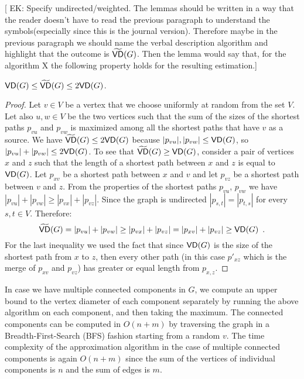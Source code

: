 [ EK: Specify undirected/weighted. The lemmas should be written in a way that the reader doesn't have to 
read the previous paragraph to understand the symbols(especially since this is the journal version). 
Therefore maybe in the previous paragraph we should name the verbal description algorithm and highlight that the outcome is  $\widetilde{\mathsf{VD}}(G)$.
Then the lemma would say that, for the algorithm X the following property holds
for the resulting estimation.]
\begin{lemma}\label{lem:diam}
  $\mathsf{VD}(G)\le\widetilde{\mathsf{VD}}(G)\le 2\mathsf{VD}(G)$.
\end{lemma}
\begin{proof}
  Let $v\in V$ be a vertex that we choose uniformly at random from the set $V$.
  Let also $u,w\in V$ be the two vertices such that the sum of the sizes of the
  shortest paths $p_{vu}$ and $p_{vw}$ is maximized among all the shortest paths
  that have $v$ as a source.  We have $\widetilde{\mathsf{VD}}(G)\le 2\mathsf{VD}(G)$ because
  $|p_{vu}|,|p_{vw}|\le\mathsf{VD}(G)$, so $|p_{vu}|+|p_{vw}|\le 2\mathsf{VD}(G)$. To see
  that $\widetilde{\mathsf{VD}}(G)\ge\mathsf{VD}(G)$, consider a pair of vertices $x$ and $z$ such
  that the length of a shortest path between $x$ and $z$ is equal to $\mathsf{VD}(G)$.
  Let $p_{xv}$ be a shortest path between $x$ and $v$ and let $p_{vz}$ be a
  shortest path between $v$ and $z$. 
  From the properties of the shortest paths $p_{vu}$, $p_{vw}$ we have
  $|p_{vu}|+|p_{vw}|\geq |p_{vx}|+|p_{vz}|$. Since the graph is undirected
  $|p_{s,t}|=|p_{t,s}|$ for every $s,t\in V$.
  Therefore:
  \[
    \widetilde{\mathsf{VD}}(G) = |p_{vu}|+|p_{vw}|\geq |p_{vx}|+|p_{vz}| =
    |p_{xv}|+|p_{vz}|\ge\mathsf{VD}(G)\enspace. 
  \]
  For the last inequality we used the fact that since $\mathsf{VD}(G)$ is the size of
  the shortest path from $x$ to $z$, then every other path (in this case
  $p'_{xz}$ which is the merge of $p_{xv}$ and $p_{vz}$) has greater or equal
  length from $p_{x,z}$.
\end{proof}
\fi
In case we have multiple connected components in $G$, we compute an upper bound
to the vertex diameter of each component separately by running the above
algorithm on each component, and then taking the maximum. 
The connected components can be computed in $O(n+m)$ by traversing the graph in
a Breadth-First-Search (BFS) fashion starting from a random $v$.
The time complexity of the approximation algorithm in the case of multiple
connected components is again $O(n+m)$ since the sum of the vertices of
individual components is $n$ and the sum of edges is $m$. 

